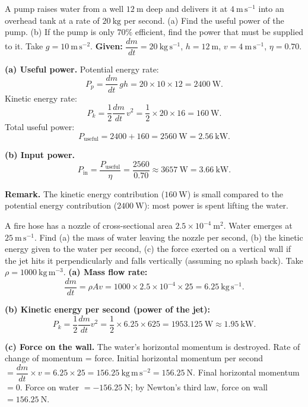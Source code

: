 \documentclass[11pt]{article}
\begin{document}
\begin{exoresolu}
A pump raises water from a well $12\ \mathrm{m}$ deep and delivers it at $4\ \mathrm{m\,s^{-1}}$ into an overhead tank at a rate of $20\ \mathrm{kg}$ per second. (a) Find the useful power of the pump. (b) If the pump is only $70\%$ efficient, find the power that must be supplied to it. Take $g = 10\ \mathrm{m\,s^{-2}}$.
\tcblower
\textbf{Given:} $\dfrac{dm}{dt} = 20\ \mathrm{kg\,s^{-1}}$, $h = 12\ \mathrm{m}$, $v = 4\ \mathrm{m\,s^{-1}}$, $\eta = 0.70$.

\textbf{(a) Useful power.}
Potential energy rate:
\[
P_p = \frac{dm}{dt}\,gh = 20 \times 10 \times 12 = 2400\ \mathrm{W}.
\]
Kinetic energy rate:
\[
P_k = \frac{1}{2}\frac{dm}{dt}\,v^2 = \frac{1}{2} \times 20 \times 16 = 160\ \mathrm{W}.
\]
Total useful power:
\[
P_{\text{useful}} = 2400 + 160 = 2560\ \mathrm{W} = 2.56\ \mathrm{kW}.
\]

\textbf{(b) Input power.}
\[
P_{\text{in}} = \frac{P_{\text{useful}}}{\eta} = \frac{2560}{0.70} \approx 3657\ \mathrm{W} = 3.66\ \mathrm{kW}.
\]

\textbf{Remark.} The kinetic energy contribution ($160\ \mathrm{W}$) is small compared to the potential energy contribution ($2400\ \mathrm{W}$): most power is spent lifting the water.
\end{exoresolu}

\begin{exoresolu}
A fire hose has a nozzle of cross-sectional area $2.5 \times 10^{-4}\ \mathrm{m^2}$. Water emerges at $25\ \mathrm{m\,s^{-1}}$. Find (a) the mass of water leaving the nozzle per second, (b) the kinetic energy given to the water per second, (c) the force exerted on a vertical wall if the jet hits it perpendicularly and falls vertically (assuming no splash back). Take $\rho = 1000\ \mathrm{kg\,m^{-3}}$.
\tcblower
\textbf{(a) Mass flow rate:}
\[
\frac{dm}{dt} = \rho A v = 1000 \times 2.5 \times 10^{-4} \times 25 = 6.25\ \mathrm{kg\,s^{-1}}.
\]

\textbf{(b) Kinetic energy per second (power of the jet):}
\[
P_k = \frac{1}{2}\frac{dm}{dt}v^2 = \frac{1}{2} \times 6.25 \times 625 = 1953.125\ \mathrm{W} \approx 1.95\ \mathrm{kW}.
\]

\textbf{(c) Force on the wall.} The water's horizontal momentum is destroyed. Rate of change of momentum = force.
Initial horizontal momentum per second $= \dfrac{dm}{dt} \times v = 6.25 \times 25 = 156.25\ \mathrm{kg\,m\,s^{-2}} = 156.25\ \mathrm{N}$.
Final horizontal momentum $= 0$. Force on water $= -156.25\ \mathrm{N}$; by Newton's third law, force on wall $= 156.25\ \mathrm{N}$.
\end{exoresolu}
\end{document}
